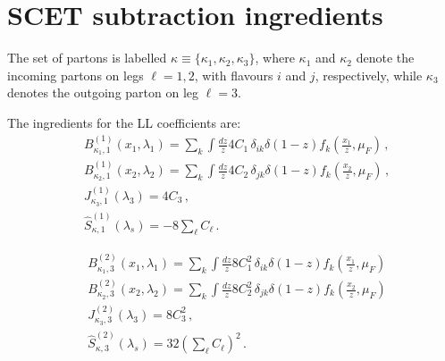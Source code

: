 \section{SCET subtraction ingredients}
\label{ap:subtract-ingred}

The set of partons is labelled
$\kappa\equiv\{\kappa_1,\kappa_2,\kappa_3\}$, where $\kappa_1$ and
$\kappa_2$ denote the incoming partons on legs $\ell=1,2$, with flavours
$i$ and $j$, respectively, while $\kappa_3$ denotes the outgoing parton
on leg $\ell=3$.

The ingredients for the LL coefficients are:
\begin{subequations}
\label{eq:C11-ingred}
\begin{align}
&B_{\kappa_{1},1}^{(1)}(x_1,\lambda_1) = \sum_{k}\int\frac{dz}{z} 4C_1\,\delta_{ik}\delta(1-z) f_k\left(\frac{x_1}{z},\mu_F\right)\,, \\[1ex]
&B_{\kappa_{2},1}^{(1)}(x_2,\lambda_2) = \sum_{k}\int\frac{dz}{z} 4C_2\,\delta_{jk}\delta(1-z)  f_k\left(\frac{x_2}{z},\mu_F\right)\,, \\[1ex]
&J_{\kappa_3,1}^{(1)}(\lambda_3) = 4C_3\,, \\[1ex]
&\widehat{S}_{\kappa,1}^{(1)} \left(\lambda_s\right)= -8\sum_{\ell}C_{\ell}\,.
\end{align}
\end{subequations}

\begin{subequations}
\label{eq:C23-ingred}
\begin{align}
&B_{\kappa_{1},3}^{(2)}(x_1,\lambda_1) = \sum_{k}\int\frac{dz}{z}
8C_1^2\,\delta_{ik}\delta(1-z) f_k\left(\frac{x_1}{z},\mu_F\right) \\[1ex]
&B_{\kappa_{2},3}^{(2)}(x_2,\lambda_2) = \sum_{k}\int\frac{dz}{z}
8C_2^2\,\delta_{jk}\delta(1-z) f_k\left(\frac{x_2}{z},\mu_F\right) \\[1ex]
&J_{\kappa_3,3}^{(2)}(\lambda_3) = 8C_3^2\,, \\[1ex]
&\widehat{S}_{\kappa,3}^{(2)}\left(\lambda_s\right) = 32\left(\sum_{\ell}C_{\ell}\right)^2\,.
\end{align}
\end{subequations}

